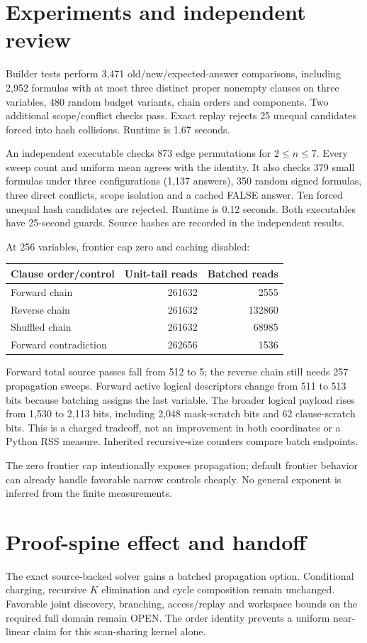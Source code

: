 \documentclass[11pt]{article}
\begin{document}
\section{Experiments and independent review}
Builder tests perform 3,471 old/new/expected-answer comparisons, including
2,952 formulas with at most three distinct proper nonempty clauses on
three variables, 480 random budget variants, chain orders and components.
Two additional scope/conflict checks pass. Exact replay rejects 25
unequal candidates forced into hash collisions. Runtime is 1.67 seconds.

An independent executable checks 873 edge permutations for $2\le n\le7$.
Every sweep count and uniform mean agrees with the identity. It also
checks 379 small formulas under three configurations (1,137 answers),
350 random signed formulas, three direct conflicts, scope isolation
and a cached FALSE answer. Ten forced unequal hash candidates are
rejected. Runtime is 0.12 seconds. Both executables have 25-second
guards. Source hashes are recorded in the independent results.

At 256 variables, frontier cap zero and caching disabled:
\begin{center}
\begin{tabular}{lrr}
\toprule
Clause order/control & Unit-tail reads & Batched reads\\
\midrule
Forward chain & 261632 & 2555\\
Reverse chain & 261632 & 132860\\
Shuffled chain & 261632 & 68985\\
Forward contradiction & 262656 & 1536\\
\bottomrule
\end{tabular}
\end{center}
Forward total source passes fall from 512 to 5; the reverse chain
still needs 257 propagation sweeps. Forward active logical descriptors
change from 511 to 513 bits because batching assigns the last variable.
The broader logical payload rises from 1,530 to 2,113 bits, including
2,048 mask-scratch bits and 62 clause-scratch bits. This is a charged
tradeoff, not an improvement in both coordinates or a Python RSS measure.
Inherited recursive-size counters compare batch endpoints.

The zero frontier cap intentionally exposes propagation; default
frontier behavior can already handle favorable narrow controls cheaply.
No general exponent is inferred from the finite measurements.

\section{Proof-spine effect and handoff}
The exact source-backed solver gains a batched propagation option.
Conditional charging, recursive $K$ elimination and cycle composition
remain unchanged. Favorable joint discovery, branching, access/replay
and workspace bounds on the required full domain remain OPEN.
The order identity prevents a uniform near-linear claim for this
scan-sharing kernel alone.
\end{document}
